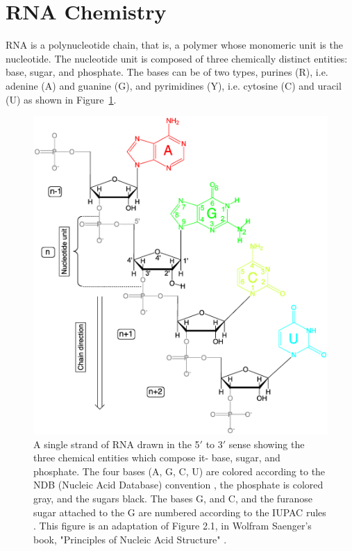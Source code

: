 \section{RNA Chemistry}
\label{sec:rnachem}
RNA is  a polynucleotide  chain, that is,  a polymer  whose monomeric
unit  is the  nucleotide.  The  nucleotide unit  is composed  of three
chemically distinct  entities: base,  sugar, and phosphate.  The bases
can be  of two types, purines  (R), i.e. adenine (A)  and guanine (G),
and  pyrimidines (Y), i.e.  cytosine (C)  and uracil  (U) as  shown in
Figure~\ref{fig:chemistry1}.
\begin{figure}
\centering
\includegraphics[scale=0.8]{Chapter1/chemistry1b.png}
\caption{A  single strand  of  RNA drawn  in  the 5$'$  to 3$'$  sense
  showing the  three chemical entities which compose  it- base, sugar,
  and phosphate.  The four bases (A, G, C, U) are colored according to
  the  NDB  (Nucleic  Acid  Database)  convention  \cite{ndburl},  the
  phosphate is colored gray, and the sugars black. The bases G, and C,
  and the furanose  sugar attached to the G  are numbered according to
  the IUPAC  rules \cite{iupac1983}. This  figure is an  adaptation of
  Figure 2.1,  in Wolfram Saenger's book, "Principles  of Nucleic Acid
  Structure" \cite{saenger1984}.}
\label{fig:chemistry1}
\end{figure}  

